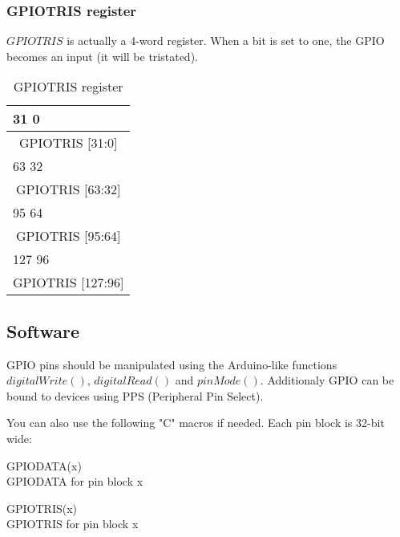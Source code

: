\subsubsection{GPIOTRIS register}
$GPIOTRIS$ is actually a 4-word register. When a bit is set to one, the GPIO becomes an input (it will be tristated).

\begin{table}[H]
\begin{center}
\begin{tabularx}{14cm}{X}
31 \hfill 0 \\
\hline
\multicolumn{1}{|c|}{\tiny GPIOTRIS [31:0]} \\
\hline
63 \hfill 32 \\
\hline
\multicolumn{1}{|c|}{\tiny GPIOTRIS [63:32]} \\
\hline
95 \hfill 64 \\
\hline
\multicolumn{1}{|c|}{\tiny GPIOTRIS [95:64]} \\
\hline
127 \hfill 96 \\
\hline
\multicolumn{1}{|c|}{\tiny GPIOTRIS [127:96]} \\
\hline
\end{tabularx}
\caption{GPIOTRIS register}
\end{center}
\end{table}



\subsection{Software}

GPIO pins should be manipulated using the Arduino-like functions $digitalWrite()$, $digitalRead()$ and $pinMode()$.
Additionaly GPIO can be bound to devices using PPS (Peripheral Pin Select).
                                   
You can also use the following "C" macros if needed. Each pin block is 32-bit wide:

\begin{description}
\item{GPIODATA(x)} \hfill \\ GPIODATA for pin block x
\item{GPIOTRIS(x)} \hfill \\ GPIOTRIS for pin block x
\end{description}
